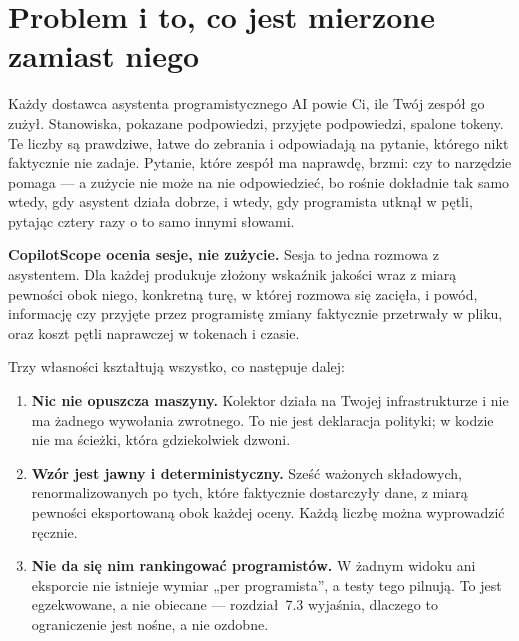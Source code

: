 \documentclass[11pt,a4paper]{article}
\newcommand{\finding}[1]{{\color{primaryblue}\textbf{#1}}}
\begin{document}
{\small\tableofcontents}

\newpage

\section{Problem i to, co jest mierzone zamiast niego}

Każdy dostawca asystenta programistycznego AI powie Ci, ile Twój zespół go
zużył. Stanowiska, pokazane podpowiedzi, przyjęte podpowiedzi, spalone tokeny.
Te liczby są prawdziwe, łatwe do zebrania i odpowiadają na pytanie, którego
nikt faktycznie nie zadaje. Pytanie, które zespół ma naprawdę, brzmi: czy to
narzędzie pomaga --- a zużycie nie może na nie odpowiedzieć, bo rośnie
dokładnie tak samo wtedy, gdy asystent działa dobrze, i wtedy, gdy programista
utknął w pętli, pytając cztery razy o to samo innymi słowami.

\finding{CopilotScope ocenia sesje, nie zużycie.} Sesja to jedna rozmowa z
asystentem. Dla każdej produkuje złożony wskaźnik jakości wraz z miarą pewności
obok niego, konkretną turę, w której rozmowa się zacięła, i powód, informację
czy przyjęte przez programistę zmiany faktycznie przetrwały w pliku, oraz koszt
pętli naprawczej w tokenach i czasie.

Trzy własności kształtują wszystko, co następuje dalej:

\begin{enumerate}[leftmargin=*]
    \item \textbf{Nic nie opuszcza maszyny.} Kolektor działa na Twojej
    infrastrukturze i nie ma żadnego wywołania zwrotnego. To nie jest deklaracja
    polityki; w kodzie nie ma ścieżki, która gdziekolwiek dzwoni.
    \item \textbf{Wzór jest jawny i deterministyczny.} Sześć ważonych składowych,
    renormalizowanych po tych, które faktycznie dostarczyły dane, z miarą
    pewności eksportowaną obok każdej oceny. Każdą liczbę można wyprowadzić
    ręcznie.
    \item \textbf{Nie da się nim rankingować programistów.} W żadnym widoku ani
    eksporcie nie istnieje wymiar „per programista'', a testy tego pilnują. To
    jest egzekwowane, a nie obiecane --- rozdział~7.3 wyjaśnia, dlaczego to
    ograniczenie jest nośne, a nie ozdobne.
\end{enumerate}
\end{document}
